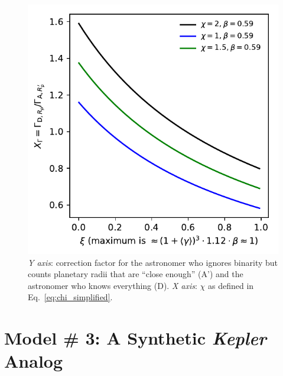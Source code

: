 \documentclass{emulateapj}
\begin{document}
\begin{figure}[!t]
	\begin{center}
		\includegraphics[scale=.8]{figures/XGamma_vs_xi.pdf}
	\end{center}
	\caption{\textit{Y axis}: correction factor for the astronomer who 
	ignores binarity but counts planetary radii that are ``close enough'' (A') 
	and the astronomer who knows everything (D).
	\textit{X axis}: $\chi$ as defined in Eq.~\ref{eq:chi_simplified}.
	}
	\label{fig:XGamma_vs_xi}
\end{figure}



\section{Model \# 3: A Synthetic {\it Kepler} Analog}
\label{sec:model_3}
\end{document}
